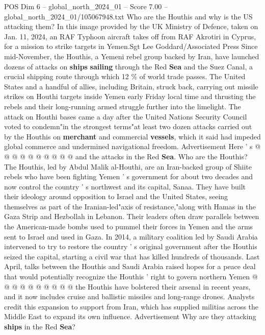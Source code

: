 \begin{textsample}{POS Dim 6 – global\_north\_2024\_01 – Score 7.00 – global\_north\_2024\_01/105067948.txt}  \label{ex:f6_pos_116}
Who are the Houthis and why is the US attacking them?
In this image provided by the UK Ministry of Defence, taken on Jan. 11, 2024, an RAF Typhoon aircraft takes off from RAF Akrotiri in Cyprus, for a mission to strike targets in Yemen.Sgt Lee Goddard/Associated Press Since mid-November, the Houthis, a Yemeni rebel group backed by Iran, have launched dozens of attacks on \textbf{ships} \textbf{sailing} through the Red \textbf{Sea} and the Suez Canal, a crucial shipping route through which 12 \% of world trade passes.
The United States and a handful of allies, including Britain, struck back, carrying out missile strikes on Houthi targets inside Yemen early Friday local time and thrusting the rebels and their long-running armed struggle further into the limelight.
The attack on Houthi bases came a day after the United Nations Security Council voted to condemn"in the strongest terms"at least two dozen attacks carried out by the Houthis on \textbf{merchant} and commercial \textbf{vessels}, which it said had impeded global commerce and undermined navigational freedom.
Advertisement Here ' s @ @ @ @ @ @ @ @ @ @ and the attacks in the Red \textbf{Sea}.
Who are the Houthis?
The Houthis, led by Abdul Malik al-Houthi, are an Iran-backed group of Shiite rebels who have been fighting Yemen ' s government for about two decades and now control the country ' s northwest and its capital, Sanaa.
They have built their ideology around opposition to Israel and the United States, seeing themselves as part of the Iranian-led"axis of resistance,"along with Hamas in the Gaza Strip and Hezbollah in Lebanon.
Their leaders often draw parallels between the American-made bombs used to pummel their forces in Yemen and the arms sent to Israel and used in Gaza.
In 2014, a military coalition led by Saudi Arabia intervened to try to restore the country ' s original government after the Houthis seized the capital, starting a civil war that has killed hundreds of thousands.
Last April, talks between the Houthis and Saudi Arabia raised hopes for a peace deal that would potentially recognize the Houthis ' right to govern northern Yemen @ @ @ @ @ @ @ @ @ @ the Houthis have bolstered their arsenal in recent years, and it now includes cruise and ballistic missiles and long-range drones.
Analysts credit this expansion to support from Iran, which has supplied militias across the Middle East to expand its own influence.
Advertisement Why are they attacking \textbf{ships} in the Red \textbf{Sea}?

\end{textsample}

